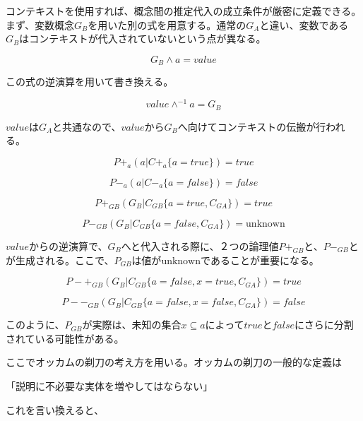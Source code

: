 \documentclass[12pt]{article}
\begin{document}
コンテキストを使用すれば、概念間の推定代入の成立条件が厳密に定義できる。まず、変数概念\(G_B\)を用いた別の式を用意する。通常の\(G_A\)と違い、変数である\(G_B\)はコンテキストが代入されていないという点が異なる。

\begin{equation} G_B \wedge a = value \end{equation}

この式の逆演算を用いて書き換える。

\begin{equation} value \wedge^{-1} a = G_B\end{equation}

\(value\)は\(G_A\)と共通なので、\(value\)から\(G_B\)へ向けてコンテキストの伝搬が行われる。

\begin{equation} P+_{a}(a | C+_{a}\{a=true\})=true \end{equation}

\begin{equation} P-_{a}(a | C-_{a}\{a=false\})=false\end{equation}

\begin{equation} P+_{GB}(G_B|C_{GB}\{a=true,C_{GA}\}) =true \end{equation}

\begin{equation} P-_{GB}(G_B|C_{GB}\{a=false,C_{GA}\}) = \text{unknown}\end{equation}

\(value\)からの逆演算で、\(G_B\)へと代入される際に、２つの論理値\(P+_{GB}\)と、\(P-_{GB}\)とが生成される。ここで、\(P_{GB}\)は値が\(\text{unknown}\)であることが重要になる。

\begin{equation} P-+_{GB}(G_B|C_{GB}\{a=false,x=true,C_{GA}\})=true\end{equation}

\begin{equation} P--_{GB}(G_B|C_{GB}\{a=false,x=false,C_{GA}\})=false\end{equation}

このように、\(P_{GB}\)が実際は、未知の集合\(x\subseteq a\)によって\(true\)と\(false\)にさらに分割されている可能性がある。

ここでオッカムの剃刀の考え方を用いる。オッカムの剃刀の一般的な定義は

「説明に不必要な実体を増やしてはならない」

これを言い換えると、
\end{document}

